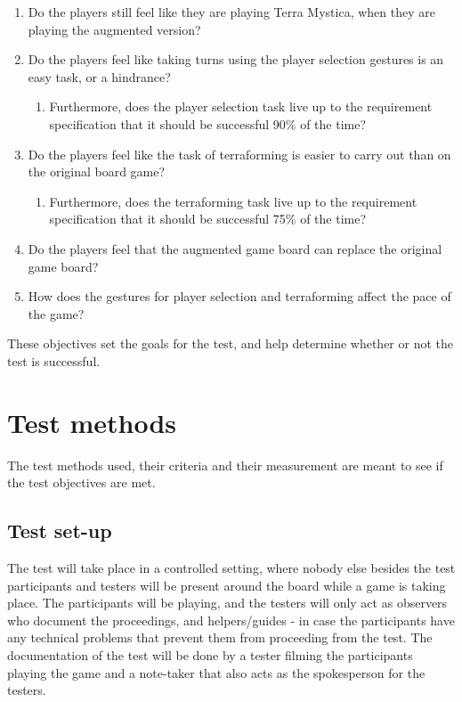 \begin{enumerate}
\item Do the players still feel like they are playing Terra Mystica, when they are playing the augmented version?
\item Do the players feel like taking turns using the player selection gestures is an easy task, or a hindrance?
\begin{enumerate}
\item Furthermore, does the player selection task live up to the requirement specification that it should be successful 90\% of the time?
\end{enumerate}
\item Do the players feel like the task of terraforming is easier to carry out than on the original board game?
\begin{enumerate}
\item Furthermore, does the terraforming task live up to the requirement specification that it should be successful 75\% of the time?
\end{enumerate}
\item Do the players feel that the augmented game board can replace the original game board?
\item How does the gestures for player selection and terraforming affect the pace of the game?
\end{enumerate}

These objectives set the goals for the test, and help determine whether or not the test is successful. 

\section{Test methods}
The test methods used, their criteria and their measurement are meant to see if the test objectives are met.

\subsection{Test set-up}
The test will take place in a controlled setting, where nobody else besides the test participants and testers will be present around the board while a game is taking place. The participants will be playing, and the testers will only act as observers who document the proceedings, and helpers/guides - in case the participants have any technical problems that prevent them from proceeding from the test.
The documentation of the test will be done by a tester filming the participants playing the game and a note-taker that also acts as the spokesperson for the testers.

